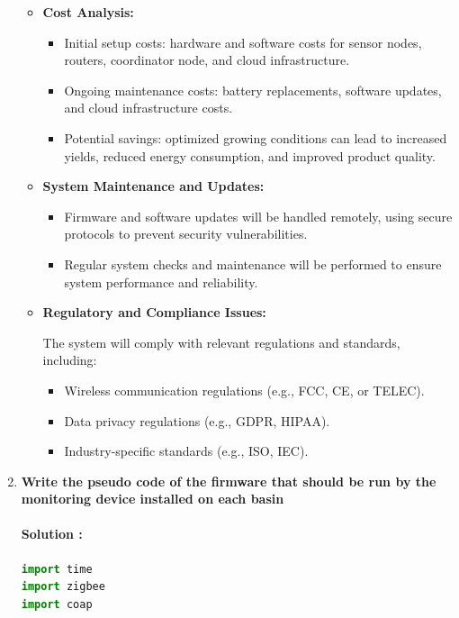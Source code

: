 \documentclass{article}
\begin{document}
\begin{enumerate}
\begin{itemize}
\item \textbf{Cost Analysis:}

\begin{itemize}
    \item Initial setup costs: hardware and software costs for sensor nodes, routers, coordinator node, and cloud infrastructure.
    \item Ongoing maintenance costs: battery replacements, software updates, and cloud infrastructure costs.
    \item Potential savings: optimized growing conditions can lead to increased yields, reduced energy consumption, and improved product quality.
\end{itemize}

\item \textbf{System Maintenance and Updates:}

\begin{itemize}
    \item Firmware and software updates will be handled remotely, using secure protocols to prevent security vulnerabilities.
    \item Regular system checks and maintenance will be performed to ensure system performance and reliability.
\end{itemize}

\item \textbf{Regulatory and Compliance Issues:}

The system will comply with relevant regulations and standards, including:
\begin{itemize}
    \item Wireless communication regulations (e.g., FCC, CE, or TELEC).
    \item Data privacy regulations (e.g., GDPR, HIPAA).
    \item Industry-specific standards (e.g., ISO, IEC).
\end{itemize}

\end{itemize}

\newpage

\item \textbf{Write the pseudo code of the firmware that should be run by the monitoring device installed on each basin}

\paragraph{Solution :} 

\begin{lstlisting}[language=Python]
import time
import zigbee
import coap


\end{lstlisting}
\end{enumerate}
\end{document}
